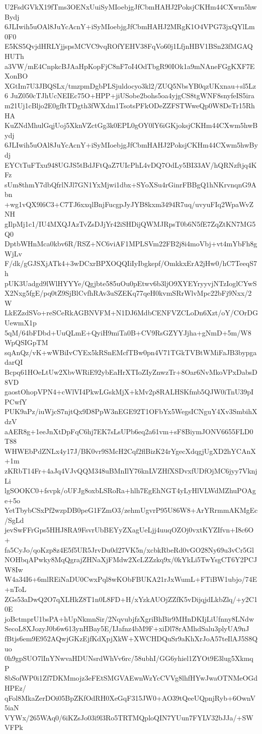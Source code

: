 U2FsdGVkX19fTms3OENxUuiSyMIoebjgJfCbmHAHJ2PoksjCKHm44CXwm5hwBydj
6JLIwih5uOAl8JuYcAcnY+iSyMIoebjgJfCbmHAHJ2MRgK1O4VPG73jxQYlLm0F0
E5KS5QvjdHRLYjjspsMCVC9vqROfYEHV38FqVo60j1LfjnHBV1BSn23fMGAQHUTh
a3VW/mE4CnpkcBJAaHpKopFjC8nF7oI4OdTbgR90IOk1a9mNAneFGgKXF7EXonBO
XGtIm7U3JBQSLx/tmzpmDgbPLSjuldocyo3kl2/ZUQ5NbsYB0qzUKxnau+sl5Lz6
JuZ050cTJhUcNEIEc75O+HPP+jiUSobe2bohs5oa4yjgCS8tgWNF8snyfeIS5ira
m21Uj1cBljo2E0gfItTDgth3fWXdm1TsotsPFkODeZZFSTWweQp0W8DeTr15RhHA
KuZNdMhulGqjUoj5XknVZctGg3k0EPL0gOY0lY6iGKjoksjCKHm44CXwm5hwBydj
6JLIwih5uOAl8JuYcAcnY+iSyMIoebjgJfCbmHAHJ2PoksjCKHm44CXwm5hwBydj
EYCtTuFTxu948UGJS5tBdJFtQaZ7UIcPhL4vDQ7OdLy5BI33AV/hQRNzftjq4KFz
sUm8thmY7dbQfrlNJl7GN1YxMjwi1dbx+SYoXSu4rGinrFBBgQ1hNKrvnqnG9Abn
+wg1vQX9l6C3+C7TJ6xxqlBnjFucgpJyJYB8kxm3494R7uq/uvyuFIq2WpaWvZNH
gIlpMj1c1/IU4MXQJAzTvZsDJjYr42iSHDijQWMJRpsT0b6N5fE7ZqZtKN7MG5Q0
DptbWHnMca0kbv6R/RSZ+NC6viAF1MPLSVm22FB2j8i4moVbj+vt4mYbFh8gWjLv
F/dk/gGJSXjATk4+3wDCxrBPXOQQIiIyIbgkepf/OmkkxErA2jHw0/hC7TeeqS7h
pUK3Uadgd9lWlHYYYe/Qgjbte585uOu0pEtwv6b3ljO9XYEYryyvjNTzIoglCYwS
X2Nxg5fgE/pq0tZ9SjBlCvfhRAv3uSZEKq77qeH0kvmSRrWlvMpc22bFj9Nxx/2W
LkEZzdSVo+reSCeRkAGBNVFM+N1DJ6MdbCENFVZCLoDn6Xzt/oY/COrDGUewmX1p
5qM/64bFDbd+UuQLmE+QyiH9miTa0B+CV9RsGZYYJjha+gNmD+5m/W8WpQSIGpTM
sqAnQz/vK+wWBiIvCYEx5kRSnEMcfTBw0pn4V71TGkTVBtWMiFaJB3bypgadarQI
Bcpq61HOeLtUw2XbvWRiE92ybEaHrXTIoZIyZnwzTr+8Oar6NvMkoVPxDabsD8VD
gaostOhopVPN4+cWlVI4PkwLGskMjX+kMv2p8RALHSKfmb5QJW0iTnU39pIPCwfY
PUK9aPz/iuWjcS7njtQx9D8PpW3nEGE92T1OFbYx5WegsICNguY4Xv3SmbihXdzV
aAER8g+1eeJnXtDpFqC6hj7EK7sLsUPb6eq2a61vm+sF8BiymJONV6655FLD0T88
WHWEbPdZNLx4y17J/BK0vr9SMcH2Cqf2flBizK24rYgecXdqgjUgXD2hYCAnX+1m
zKRbT14Fr+4aJq4VJvQQM348uBMnIlY76knLVZHfXSDvxfUDfOjMC6jyy7VknjLi
lgSOOKC0+fsvpk/oUFJg8oxbLSRoRa+hlh7EgEhNGT4yLyHlVLWdMZhuPOAge+5o
YetTbybCSxPf2wzpDB0peG1FZmO3/zehmUgvrP95U86W8+ArYRrmmAKMgEc/SgLd
jevSwFFrGps5HHJ8RA9FsvrUbBEYyZXagUeLjj4uuqOZOj0vxtKYZIfvn+I8c6O+
fa5CyJo/qoKzp8z4E5f5UR5JrvDu0d27VK5n/xcbkRbeRd0vGO28Ny69u3vCr5Gl
NOHbqAPwky8MqQgrajZHNaXjFMdw2XcLZZzkq9x/0kYkLi5TwYsgCT6Y2PCJW8Iw
W4a34I6+6mlREiNaDU0CwxPql8wKObFBUKA21rJxWumL+FTiBW1ubjo/74E+nToL
ZGs53aDwQ2O7qXLHkZ8T1n0L8FD+H/xYzkAUOjZZfK5vDijqjdLkbZlq/+y2C10E
joBctmprU1bsPA+hUpNkmnSir/2NqvubjfzXgriBhBir9MHnDKIjLiUfnny8LNdw
SecoL8XJozyJ0b6w613ynHBay5E/IJafnz4bM9F+xiDl78rAMhdSalu3plyUA9nJ
fBtjs6em9E952AQwjGKzEjfKdXpjXkW+XWCHDQuSr9aKhXrJoA57teIlAJ5S8Quo
0h9gpSUO7lInYNwvaHDUNsrdWhVv6rc/58ubhI/GG6yhiel1ZYOt9E3lug5XkmqP
8bSofWP0i1Zf7DKMmojz3eFEtSMGVAEwnWzYcCVVg8lhfHYwJwaOTNMeOGdHPEz/
qFol8MkaZerDOi05BpZKfOdRH0XeGqF315JW0+AO39tQeeUQpnjRyb+6OwnV5iaN
VYWx/265WAq0/6iKZsJo03i9l3Ro5TRTMQploQIN7YUun7FYLV32bJJa/+SWVFPk
